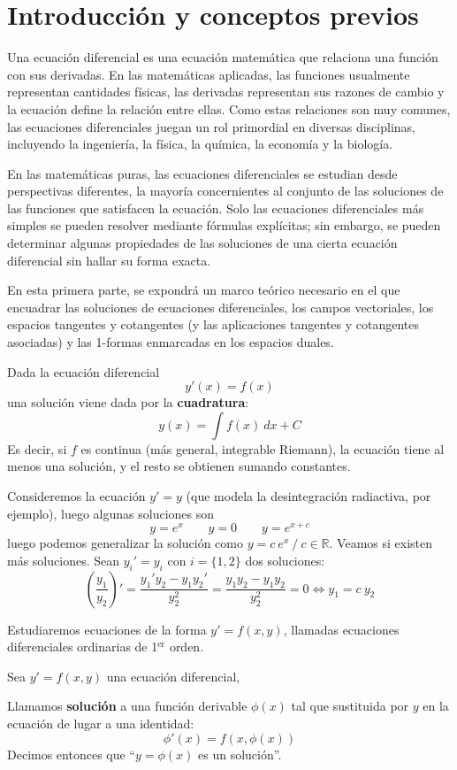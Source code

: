 
\section{Introducción y conceptos previos}
Una ecuación diferencial es una ecuación matemática que relaciona una función con sus derivadas. En las matemáticas aplicadas, las funciones usualmente representan cantidades físicas, las derivadas representan sus razones de cambio y la ecuación define la relación entre ellas. Como estas relaciones son muy comunes, las ecuaciones diferenciales juegan un rol primordial en diversas disciplinas, incluyendo la ingeniería, la física, la química, la economía y la biología.

En las matemáticas puras, las ecuaciones diferenciales se estudian desde perspectivas diferentes, la mayoría concernientes al conjunto de las soluciones de las funciones que satisfacen la ecuación. Solo las ecuaciones diferenciales más simples se pueden resolver mediante fórmulas explícitas; sin embargo, se pueden determinar algunas propiedades de las soluciones de una cierta ecuación diferencial sin hallar su forma exacta.

En esta primera parte, se expondrá un marco teórico necesario en el que encuadrar las soluciones de ecuaciones diferenciales, los campos vectoriales, los espacios tangentes y cotangentes (y las aplicaciones tangentes y cotangentes asociadas) y las 1-formas enmarcadas en los espacios duales.
\begin{eje}
Dada la ecuación diferencial
$$y'(x)=f(x)$$
una solución viene dada por la \textbf{cuadratura}:
$$y(x)=\int f(x) \: dx + C$$
Es decir, si $f$ es continua (más general, integrable Riemann), la ecuación tiene al menos una solución, y el resto se obtienen sumando constantes.
\end{eje}
\begin{eje}
Consideremos la ecuación $y'=y$ (que modela la desintegración radiactiva, por ejemplo), luego algunas soluciones son 
$$y=e^x \qquad y=0 \qquad y=e^{x+c}$$
luego podemos generalizar la solución como $y=c \: e^x \: / \: c \in \mathbb{R}$. Veamos si existen más soluciones. Sean $y_i'=y_i$ con $i=\{1,2\}$ dos soluciones:
$$\left( \dfrac{y_1}{y_2} \right)'=\dfrac{y_1'y_2-y_1y_2'}{y_2^2}=\dfrac{y_1y_2-y_1y_2}{y_2^2}=0 \iff y_1=c\: y_2$$
\end{eje}
Estudiaremos ecuaciones de la forma $y'=f(x,y)$, llamadas ecuaciones diferenciales ordinarias de 1$^{\text{er}}$ orden.

Sea $y'=f(x,y)$ una ecuación diferencial,
\begin{defi}
Llamamos \textbf{solución} a una función derivable $\phi(x)$ tal que sustituida por $y$ en la ecuación de lugar a una identidad:
$$\phi'(x)=f(x,\phi(x))$$
Decimos entonces que ``$y=\phi(x)$ es un solución''.
\end{defi}
